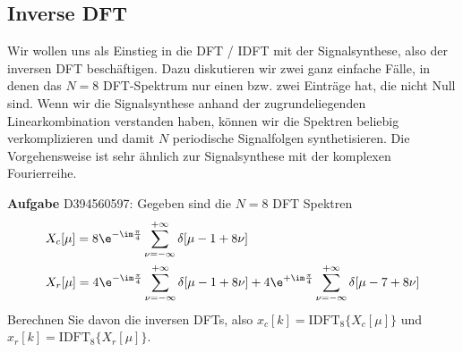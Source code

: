 \clearpage
\subsection{Inverse DFT}
\label{sec:D394560597}
\begin{Ziel}
Wir wollen uns als Einstieg in die DFT / IDFT mit der Signalsynthese, also
der inversen DFT beschäftigen. Dazu diskutieren wir zwei ganz einfache
Fälle, in denen das $N=8$ DFT-Spektrum nur einen bzw. zwei Einträge hat, die nicht Null sind.
Wenn wir die Signalsynthese anhand der zugrundeliegenden Linearkombination
verstanden haben, können wir die Spektren beliebig verkomplizieren und damit
$N$ periodische Signalfolgen synthetisieren.
Die Vorgehensweise ist sehr ähnlich zur Signalsynthese mit der komplexen
Fourierreihe.
\end{Ziel}
\textbf{Aufgabe} {\tiny D394560597}: Gegeben sind die $N=8$ DFT Spektren
\begin{align}
&X_c[\mu] = 8\e^{-\im\frac{\pi}{4}} \sum_{\nu=-\infty}^{+\infty} \delta[\mu-1 + 8\nu]\\
&X_r[\mu] =
4\e^{-\im\frac{\pi}{4}} \sum_{\nu=-\infty}^{+\infty} \delta[\mu-1 + 8\nu] +
4\e^{+\im\frac{\pi}{4}} \sum_{\nu=-\infty}^{+\infty} \delta[\mu-7 + 8\nu]
\end{align}
Berechnen Sie davon die inversen DFTs, also $x_c[k] = \text{IDFT}_8\{X_c[\mu]\}$
und $x_r[k] = \text{IDFT}_8\{X_r[\mu]\}$.

